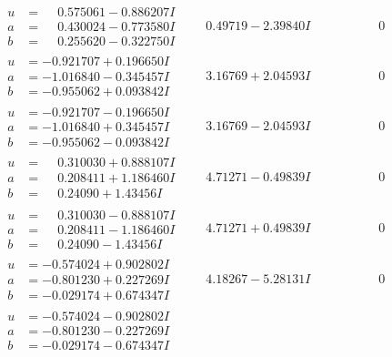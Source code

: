 \documentclass[1p]{elsarticle_modified}
\theoremstyle{definition}
\begin{document}
$$\begin{array}{c|c|c}
\begin{aligned}
u &= \phantom{-}0.575061 - 0.886207 I \\
a &= \phantom{-}0.430024 - 0.773580 I \\
b &= \phantom{-}0.255620 - 0.322750 I\end{aligned}
 & \phantom{-}0.49719 - 2.39840 I & \phantom{-0.000000 } 0 \\ \hline\begin{aligned}
u &= -0.921707 + 0.196650 I \\
a &= -1.016840 - 0.345457 I \\
b &= -0.955062 + 0.093842 I\end{aligned}
 & \phantom{-}3.16769 + 2.04593 I & \phantom{-0.000000 } 0 \\ \hline\begin{aligned}
u &= -0.921707 - 0.196650 I \\
a &= -1.016840 + 0.345457 I \\
b &= -0.955062 - 0.093842 I\end{aligned}
 & \phantom{-}3.16769 - 2.04593 I & \phantom{-0.000000 } 0 \\ \hline\begin{aligned}
u &= \phantom{-}0.310030 + 0.888107 I \\
a &= \phantom{-}0.208411 + 1.186460 I \\
b &= \phantom{-}0.24090 + 1.43456 I\end{aligned}
 & \phantom{-}4.71271 - 0.49839 I & \phantom{-0.000000 } 0 \\ \hline\begin{aligned}
u &= \phantom{-}0.310030 - 0.888107 I \\
a &= \phantom{-}0.208411 - 1.186460 I \\
b &= \phantom{-}0.24090 - 1.43456 I\end{aligned}
 & \phantom{-}4.71271 + 0.49839 I & \phantom{-0.000000 } 0 \\ \hline\begin{aligned}
u &= -0.574024 + 0.902802 I \\
a &= -0.801230 + 0.227269 I \\
b &= -0.029174 + 0.674347 I\end{aligned}
 & \phantom{-}4.18267 - 5.28131 I & \phantom{-0.000000 } 0 \\ \hline\begin{aligned}
u &= -0.574024 - 0.902802 I \\
a &= -0.801230 - 0.227269 I \\
b &= -0.029174 - 0.674347 I\end{aligned}

\end{array}$$
\end{document}
